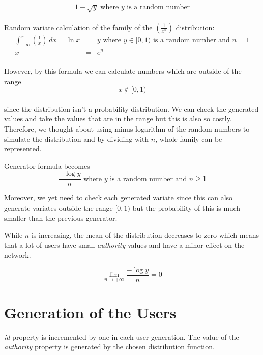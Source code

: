 \documentclass[12pt,a4paper]{report}
\begin{document}
	$$1-\sqrt y  \text{ where } y \text{ is a random number}$$ \\
		
	Random variate calculation of the family of the $(\frac{1}{x^n})$ distribution:
	\begin{eqnarray*}
		 \int_{-\infty}^x \!  (\frac{1}{x})\, dx  = \ln x & = & y \text{ where } y \in [0, 1) \text{ is a random number and } n = 1\\
		x & = & e^y \\
	\end{eqnarray*}

	However, by this formula we can calculate numbers which are outside of the range \\

	$$x \not\in [0, 1)$$ \\

	since the distribution isn't a probability distribution. We can check the generated values and take the values that are in the range but this is also so costly.\\

	Therefore, we thought about using minus logarithm of the random numbers to simulate the distribution and by dividing with $n$, whole family can be represented. \\

	\clearpage

	Generator formula becomes\\
	
	$$\frac{-\log y}{n} \text{ where } y \text{ is a random number and } n \ge 1 $$

	Moreover, we yet need to check each generated variate since this can also generate variates outside the range $[0, 1)$ but the probability of this is much smaller than the previous generator.

	While $n$ is increasing, the mean of the distribution decreases to zero which means that  a lot of users have small \emph{authority} values and have a minor effect on the network.

	$$\lim_{n \to +\infty} \frac{-\log y}{n} = 0 $$

\section{Generation of the Users}

	\hspace{0.6cm}\emph{id} property is incremented by one in each user generation. The value of the \emph{authority} property is generated by the chosen distribution function.
\end{document}
